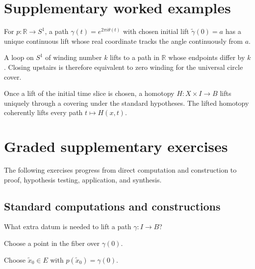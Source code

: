 \section{Supplementary worked examples}
\label{sec:viii11-pedagogy}

\begin{example}\label{ex:viii11-ped-01}
For $p:\mathbb R\to S^1$, a path $\gamma(t)=e^{2\pi i\theta(t)}$ with chosen initial lift $\widetilde\gamma(0)=a$ has a unique continuous lift whose real coordinate tracks the angle continuously from $a$.
\end{example}

\begin{example}\label{ex:viii11-ped-02}
A loop on $S^1$ of winding number $k$ lifts to a path in $\mathbb R$ whose endpoints differ by $k$.  Closing upstairs is therefore equivalent to zero winding for the universal circle cover.
\end{example}

\begin{example}\label{ex:viii11-ped-03}
Once a lift of the initial time slice is chosen, a homotopy $H:X\times I\to B$ lifts uniquely through a covering under the standard hypotheses.  The lifted homotopy coherently lifts every path $t\mapsto H(x,t)$.
\end{example}

\section{Graded supplementary exercises}
The following exercises progress from direct computation and construction to proof, hypothesis testing, application, and synthesis.

\subsection*{Standard computations and constructions}

\begin{exercise}\label{exr:viii11-ped-01}
What extra datum is needed to lift a path $\gamma:I\to B$?
\end{exercise}
\begin{hint}
Choose a point in the fiber over $\gamma(0)$.
\end{hint}
\begin{solution}
Choose $\widetilde x_0\in E$ with $p(\widetilde x_0)=\gamma(0)$.
\end{solution}

